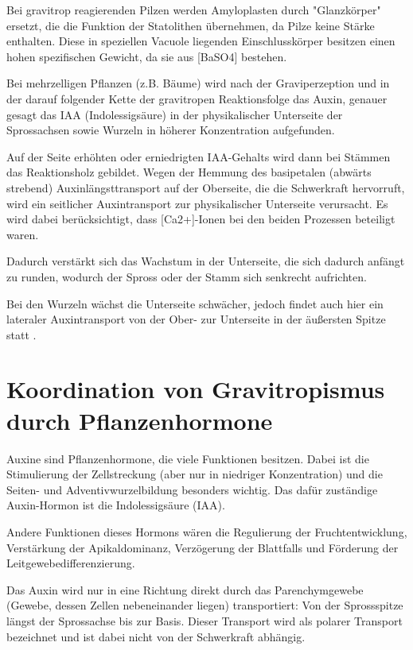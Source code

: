 \documentclass[
a4paper, 
11pt, 
ngerman,
listof=totoc,
bibliography=totocnumbered,
abstracton
]{scrreprt}
\begin{document}
Bei gravitrop reagierenden Pilzen werden Amyloplasten durch "Glanzkörper" ersetzt, die die Funktion der Statolithen übernehmen, da Pilze keine Stärke enthalten. Diese in speziellen Vacuole liegenden Einschlusskörper besitzen einen hohen spezifischen Gewicht, da sie aus [BaSO4] bestehen.

Bei mehrzelligen Pflanzen (z.B. Bäume) wird  nach der Graviperzeption und in der darauf folgender Kette der gravitropen Reaktionsfolge  das Auxin, genauer gesagt das IAA (Indolessigsäure) in der physikalischer Unterseite der Sprossachsen sowie Wurzeln in höherer Konzentration aufgefunden.

Auf der Seite erhöhten oder erniedrigten IAA-Gehalts wird dann bei Stämmen das Reaktionsholz gebildet.
Wegen der Hemmung des basipetalen (abwärts strebend) Auxinlängsttransport auf der Oberseite, die die Schwerkraft hervorruft, wird ein seitlicher Auxintransport zur physikalischer Unterseite verursacht. Es wird dabei berücksichtigt, dass [Ca2+]-Ionen bei den beiden Prozessen beteiligt waren.

Dadurch verstärkt sich das Wachstum in der Unterseite, die sich dadurch anfängt zu runden, wodurch der Spross oder der Stamm sich senkrecht aufrichten. 

Bei den Wurzeln wächst die Unterseite schwächer, jedoch findet auch hier ein lateraler Auxintransport von der Ober- zur Unterseite in der äußersten Spitze statt \parencite[453f]{Strasburger}.
    
\section{Koordination von Gravitropismus durch Pflanzenhormone}

Auxine sind Pflanzenhormone, die viele Funktionen besitzen. Dabei ist die Stimulierung der Zellstreckung (aber nur in niedriger Konzentration) und die Seiten- und Adventivwurzelbildung besonders wichtig. Das dafür zuständige Auxin-Hormon ist die Indolessigsäure (IAA).
 
Andere Funktionen dieses Hormons wären die Regulierung der Fruchtentwicklung, Verstärkung der Apikaldominanz, Verzögerung der Blattfalls und Förderung der Leitgewebedifferenzierung.

Das Auxin wird nur in eine Richtung direkt durch das Parenchymgewebe (Gewebe, dessen Zellen nebeneinander liegen) transportiert: Von der Sprossspitze längst der Sprossachse bis zur Basis. Dieser Transport wird als polarer Transport bezeichnet und ist dabei nicht von der Schwerkraft abhängig.
\end{document}
